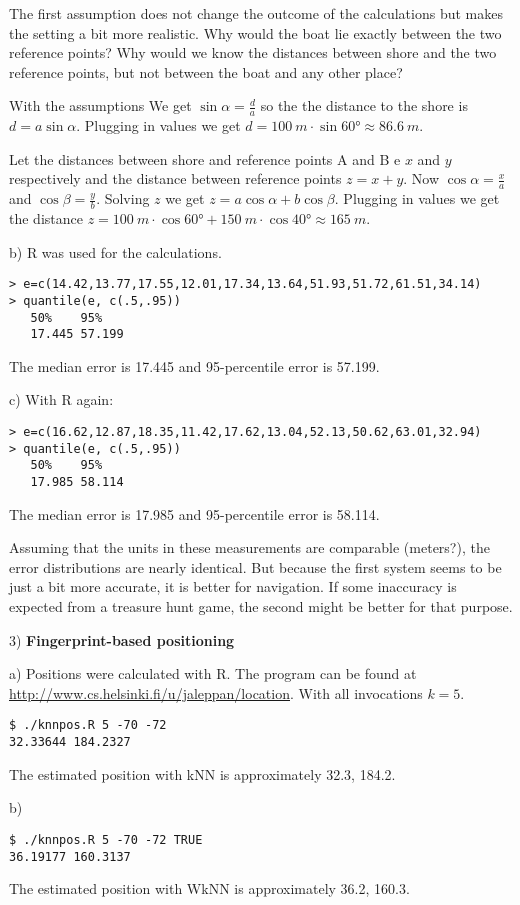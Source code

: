 \documentclass[a4paper,parskip=full]{scrartcl}
\begin{document}
The first assumption does not change the outcome of the calculations
but makes the setting a bit more realistic. Why would the boat lie exactly
between the two reference points? Why would we know the distances
between shore and the two reference points, but not between the boat and
any other place?

With the assumptions We get $\sin\alpha = \frac{d}{a}$ so the the distance to
the shore is $d = a\sin\alpha$. Plugging in values we get $d = \SI{100}{m}
\cdot \sin\ang{60} \approx \SI{86.6}{m}$.

Let the distances between shore
and reference points A and B e $x$ and $y$ respectively and the distance
between reference points $z = x + y$. Now $\cos\alpha = \frac{x}{a}$ and
$\cos\beta = \frac{y}{b}$. Solving $z$ we get $z = a\cos\alpha + b\cos\beta$.
Plugging in values we get the distance $z = \SI{100}{m} \cdot \cos\ang{60} +
\SI{150}{m} \cdot \cos\ang{40} \approx \SI{165}{m}$.

b) R was used for the calculations.
\begin{verbatim}
> e=c(14.42,13.77,17.55,12.01,17.34,13.64,51.93,51.72,61.51,34.14)
> quantile(e, c(.5,.95))
   50%    95%
   17.445 57.199
\end{verbatim}
The median error is 17.445 and 95-percentile error is 57.199.

c) With R again:
\begin{verbatim}
> e=c(16.62,12.87,18.35,11.42,17.62,13.04,52.13,50.62,63.01,32.94)
> quantile(e, c(.5,.95))
   50%    95%
   17.985 58.114
\end{verbatim}
The median error is 17.985 and 95-percentile error is 58.114.

Assuming that the units in these measurements are comparable (meters?),
the error distributions are nearly identical. But because the first system
seems to be just a bit more accurate, it is better for navigation. If some
inaccuracy is expected from a treasure hunt game, the second might be better
for that purpose.

3) \textbf{Fingerprint-based positioning}

a) Positions were calculated with R. The program can be found at
\url{http://www.cs.helsinki.fi/u/jaleppan/location}.
With all invocations $k = 5$.
\begin{verbatim}
$ ./knnpos.R 5 -70 -72
32.33644 184.2327
\end{verbatim}
The estimated position with kNN is approximately 32.3, 184.2.

b)
\begin{verbatim}
$ ./knnpos.R 5 -70 -72 TRUE
36.19177 160.3137
\end{verbatim}
The estimated position with WkNN is approximately 36.2, 160.3.
\end{document}
